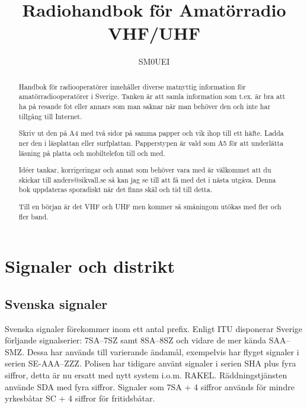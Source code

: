 \documentclass[10pt,swedish,a4paper,twoside]{article}
\begin{document}
\title{Radiohandbok för Amatörradio\\
VHF/UHF}
\author{SM0UEI}
\maketitle

\begin{abstract}
Handbok för radiooperatörer innehåller diverse matnyttig information för amatörradiooperatörer i Sverige. Tanken är att samla information som t.ex. är bra att ha på resande fot eller annars som man saknar när man behöver den och inte har tillgång till Internet.

Skriv ut den på A4 med två sidor på samma papper och vik ihop till ett häfte. Ladda ner den i läsplattan eller surfplattan. Papperstypen är vald som A5 för att underlätta läsning på platta och mobiltelefon till och med.

Idéer tankar, korrigeringar och annat som behöver vara med är väl\-kom\-met att du skickar till anders@sikvall.se så kan jag se till att få med det i nästa utgåva. Denna bok uppdateras sporadiskt när det finns skäl och tid till detta.

Till en början är det VHF och UHF men kommer så småningom utökas med fler och fler band.
\end{abstract}

\clearpage
\tableofcontents
\clearpage

\setlength{\parskip}{0.5em}
\setlength{\parindent}{0pt}


\section{Signaler och distrikt}

\subsection{Svenska signaler}

Svenska signaler förekommer inom ett antal prefix. Enligt ITU disponerar Sverige förljande signalserier:
7SA--7SZ samt 8SA--8SZ och vidare de mer kända SAA--SMZ. Dessa har används till varierande ändamål, exempelvis har flyget signaler i serien SE-AAA--ZZZ. Polisen har tidigare använt signaler i serien SHA plus fyra siffror, detta är nu ersatt med nytt system i.o.m. RAKEL. Räddningstjänsten använde SDA med fyra siffror. Signaler som 7SA + 4 siffror används för mindre yrkesbåtar SC + 4 siffror för fritidsbåtar.
\end{document}
